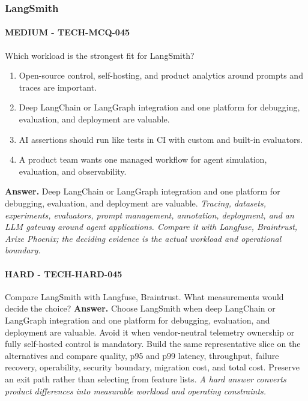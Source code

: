 \subsubsection*{LangSmith}
\paragraph{MEDIUM - TECH-MCQ-045} Which workload is the strongest fit for LangSmith?
\begin{enumerate}[label=\Alph*.]
\item Open-source control, self-hosting, and product analytics around prompts and traces are important.
\item Deep LangChain or LangGraph integration and one platform for debugging, evaluation, and deployment are valuable.
\item AI assertions should run like tests in CI with custom and built-in evaluators.
\item A product team wants one managed workflow for agent simulation, evaluation, and observability.
\end{enumerate}
\textbf{Answer.} Deep LangChain or LangGraph integration and one platform for debugging, evaluation, and deployment are valuable.
\textit{Tracing, datasets, experiments, evaluators, prompt management, annotation, deployment, and an LLM gateway around agent applications. Compare it with Langfuse, Braintrust, Arize Phoenix; the deciding evidence is the actual workload and operational boundary.}
\paragraph{HARD - TECH-HARD-045} Compare LangSmith with Langfuse, Braintrust. What measurements would decide the choice?
\textbf{Answer.} Choose LangSmith when deep LangChain or LangGraph integration and one platform for debugging, evaluation, and deployment are valuable. Avoid it when vendor-neutral telemetry ownership or fully self-hosted control is mandatory. Build the same representative slice on the alternatives and compare quality, p95 and p99 latency, throughput, failure recovery, operability, security boundary, migration cost, and total cost. Preserve an exit path rather than selecting from feature lists.
\textit{A hard answer converts product differences into measurable workload and operating constraints.}
